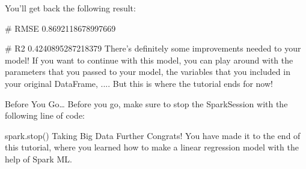 \documentclass[a4paper,12pt]{article}
\begin{document}
You'll get back the following result:

# RMSE
0.8692118678997669

# R2
0.4240895287218379
There's definitely some improvements needed to your model! If you want to continue with this model, you can play around with the parameters that you passed to your model, the variables that you included in your original DataFrame, .... But this is where the tutorial ends for now! 

Before You Go…
Before you go, make sure to stop the SparkSession with the following line of code:

spark.stop()
Taking Big Data Further
Congrats! You have made it to the end of this tutorial, where you learned how to make a linear regression model with the help of Spark ML.
\end{document}
